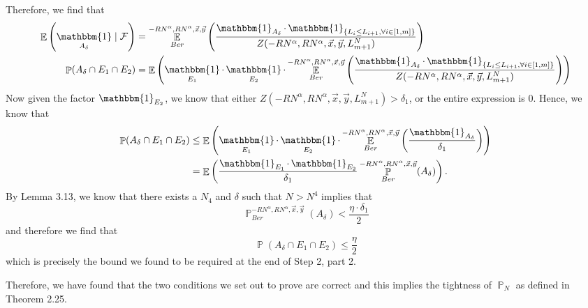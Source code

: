 \documentclass[12pt]{article}
\DeclareMathOperator{\ex}{\mathbb{E}}
\DeclareMathOperator{\pr}{\mathbb{P}}
\DeclareMathOperator{\indic}{\mathbbm{1}}
\begin{document}
Therefore, we find that 
\begin{align*}
\ex\left(\indic_{A_\delta}\mid \mathcal{F}\right)&=\ex_{Ber}^{-RN^\alpha, RN^\alpha,\vec x,\vec y}\left(\frac{\indic_{A_\delta}\cdot \indic_{\left\{L_i\leq L_{i+1},\forall i\in [1,m]\right\}}}{Z(-RN^\alpha,RN^\alpha,\vec x, \vec y, L_{m+1}^N)}\right)
\\
\pr(A_\delta\cap E_1\cap E_2)&=\ex\left(\indic_{E_1}\cdot\indic_{E_2}\cdot \ex_{Ber}^{-RN^\alpha, RN^\alpha,\vec x,\vec y}\left(\frac{\indic_{A_\delta}\cdot \indic_{\left\{L_i\leq L_{i+1},\forall i\in [1,m]\right\}}}{Z(-RN^\alpha,RN^\alpha,\vec x, \vec y, L_{m+1}^N)}\right)\right)
\end{align*}
Now given the factor $\indic_{E_2}$, we know that either $Z(-RN^\alpha,RN^\alpha,\vec x,\vec y, L_{m+1}^N)>\delta_1$, or the entire expression is $0$. Hence, we know that 
\begin{align*}
\pr(A_\delta\cap E_1\cap E_2)&\leq \ex\left(\indic_{E_1}\cdot\indic_{E_2}\cdot\ex_{Ber}^{-RN^\alpha,RN^\alpha,\vec x,\vec y}\left(\frac{\indic_{A_\delta}}{\delta_1}\right)\right)\\
&=\ex\left(\frac{\indic_{E_1}\cdot \indic_{E_2}}{\delta_1}\pr_{Ber}^{-RN^\alpha,RN^\alpha,\vec x,\vec y}(A_\delta)\right).
\end{align*}
By Lemma 3.13, we know that there exists a $N_4$ and $\delta$ such that $N>N^4$ implies that
\[\pr_{Ber}^{-RN^\alpha,RN^\alpha,\vec x,\vec y}(A_\delta)<\frac{\eta\cdot\delta_1}2\] and therefore we find that $$\pr\left(A_\delta\cap E_1\cap E_2\right)\leq \frac{\eta}{2}$$ which is precisely the bound we found to be required at the end of Step 2, part 2. 

Therefore, we have found that the two conditions we set out to prove are correct and this implies the tightness of $\pr_N$ as defined in Theorem 2.25.
	
\end{document}
